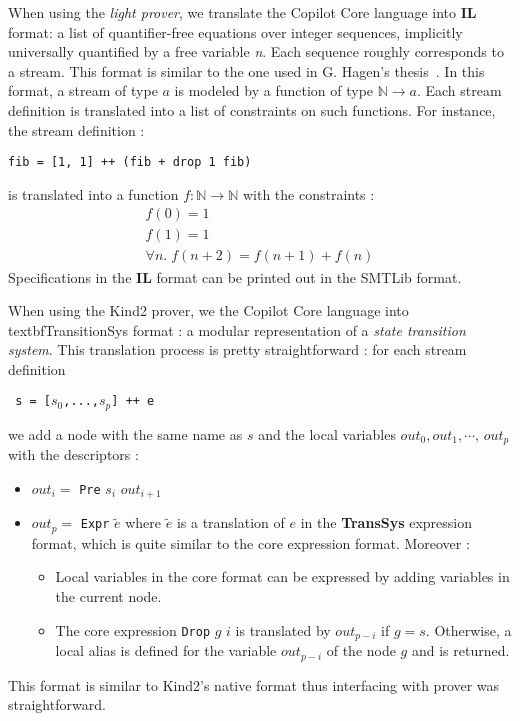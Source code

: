 When using the \emph{light prover}, we translate the Copilot Core
language into \textbf{IL} format: a list of quantifier-free equations
over integer sequences, implicitly universally quantified by a free
variable \emph{n}. Each sequence roughly corresponds to a stream. This
format is similar to the one used in G.  Hagen's
thesis~\cite{HagenPhD}.  
In this format, a stream of type $a$ is modeled by a function of type $\mathbb{N} \to a$. Each stream definition is translated into a list of constraints on such functions. For instance, the stream definition :
\begin{lstlisting}
fib = [1, 1] ++ (fib + drop 1 fib)
\end{lstlisting}
is translated into a function $f : \mathbb{N} \to \mathbb{N}$ with the constraints :
$$
\begin{array}{c}
f(0) = 1 \\
f(1) = 1 \\
\forall n . \; f(n + 2) = f(n + 1) + f(n)
\end{array}
$$
Specifications in the \textbf{IL} format can be printed out in the
SMTLib format. 


When using the Kind2 prover, we the Copilot Core
language into   textbf{TransitionSys} format : a modular
representation of a \emph{state transition system}. This translation process is pretty straightforward : for each stream definition
\begin{center}\texttt{ s = [$s_0$,...,$s_p$] ++ e}\end{center}
we add a node with the same name as $s$ and the local variables $out_0, out_1, \cdots, \, out_p$ with the descriptors :

\begin{itemize}
\item $out_{i} = $  \texttt{Pre} $s_i$  $out_{i + 1}$
\item $out_{p} = $  \texttt{Expr} $\tilde e$  where $\tilde e$ is a translation of $e$ in the \textbf{TransSys} expression format, which is quite similar to the core expression format. Moreover :

\begin{itemize}
\item Local variables in the core format can be expressed by adding variables in the current node.
\item The core expression \texttt{Drop} $g$ $i$ is translated by $out_{p - i}$ if $g = s$. Otherwise, a local alias is defined for the variable $out_{p - i}$ of the node $g$ and is returned.
\end{itemize}

\end{itemize}
This format  is similar
to Kind2's native format thus interfacing with prover was
straightforward. 

